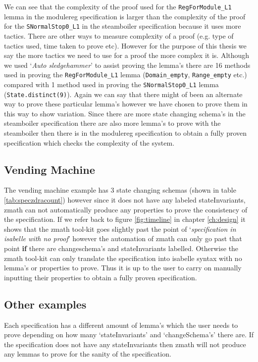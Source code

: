 We can see that the complexity of the proof used for the \verb|RegForModule_L1|
lemma in the modulereg specification is larger than the complexity of the proof
for the \verb|SNormalStop0_L1| in the steamboiler specification because it uses
more tactics.
There are other ways to measure
complexity of a proof (e.g. type of tactics used, time taken to prove etc). 
However for the purpose of this
thesis we say the more tactics we need to use for a proof the more complex it
is.  Although we
used `\emph{Auto sledgehammer}' to assist proving the lemma's there are 16
methods used in proving the \verb|RegForModule_L1| lemma (\verb|Domain_empty|,
\verb|Range_empty| etc.) compared with 1 method used in proving the
\verb|SNormalStop0_L1| lemma (\verb|State.distinct(9)|). Again we can say that
there might of been an alternate way to prove these particular lemma's however
we have chosen to prove them in this way to show variation. Since there are more
state changing schema's in the steamboiler specification there are also more
lemma's to prove with the steamboiler then there is in the modulereg
specification to obtain a fully proven specification which checks the complexity
of the system.

\subsection{Vending Machine}

The vending machine example has 3 state changing schemas (shown in table
\ref{tab:speczdracount}) however since it does not have any labeled
stateInvariants, \gls{zmath} can not automatically produce any properties to
prove the consistency of the specification. If we refer back to figure
\ref{fig:timeline} in chapter \ref{ch:design} it shows that the \gls{zmath}
tool-kit goes slightly past the point of `\emph{specification in isabelle with no
proof}' however the automation of \gls{zmath} can only go past that point
\textbf{if} there are changeschema's and stateInvariants labelled. Otherwise the
\gls{zmath} tool-kit can only translate the specification into isabelle syntax
with no lemma's or properties to prove. Thus it is up to the user to carry on
manually inputting their properties to obtain a fully proven specification.

\subsection{Other examples}

Each specification has a different amount of lemma's which the user needs to
prove depending on how many `stateInvariants' and `changeSchema's' there are. If
the specification does not have any stateInvariants then \gls{zmath} will not
produce any lemmas to prove for the sanity of the specification.

